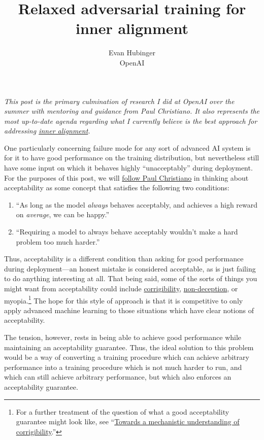 \documentclass{amsart}
\title{Relaxed adversarial training for inner alignment}
\author{Evan Hubinger \\ OpenAI}
\begin{document}
\maketitle

\textit{This post is the primary culmination of research I did at OpenAI over the summer with mentoring and guidance from Paul Christiano. It also represents the most up-to-date agenda regarding what I currently believe is the best approach for addressing \href{https://arxiv.org/abs/1906.01820}{inner alignment}.}

One particularly concerning failure mode for any sort of advanced AI system is for it to have good performance on the training distribution, but nevertheless still have some input on which it behaves highly ``unacceptably'' during deployment. For the purposes of this post, we will \href{https://ai-alignment.com/training-robust-corrigibility-ce0e0a3b9b4d}{follow Paul Christiano} in thinking about acceptability as some concept that satisfies the following two conditions:
\begin{enumerate}
    \item ``As long as the model \textit{always} behaves acceptably, and achieves a high reward on \textit{average}, we can be happy.''
    \item ``Requiring a model to always behave acceptably wouldn't make a hard problem too much harder.''
\end{enumerate}
Thus, acceptability is a different condition than asking for good performance during deployment---an honest mistake is considered acceptable, as is just failing to do anything interesting at all. That being said, some of the sorts of things you might want from acceptability could include \href{https://ai-alignment.com/corrigibility-3039e668638}{corrigibility}, \href{https://www.alignmentforum.org/s/r9tYkB2a8Fp4DN8yB/p/zthDPAjh9w6Ytbeks}{non-deception}, or myopia.\footnote{For a further treatment of the question of what a good acceptability guarantee might look like, see ``\href{https://www.alignmentforum.org/posts/BKM8uQS6QdJPZLqCr/towards-a-mechanistic-understanding-of-corrigibility}{Towards a mechanistic understanding of corrigibility}.''} The hope for this style of approach is that it is competitive to only apply advanced machine learning to those situations which have clear notions of acceptability.

The tension, however, rests in being able to achieve good performance while maintaining an acceptability guarantee. Thus, the ideal solution to this problem would be a way of converting a training procedure which can achieve arbitrary performance into a training procedure which is not much harder to run, and which can still achieve arbitrary performance, but which also enforces an acceptability guarantee.
\end{document}

